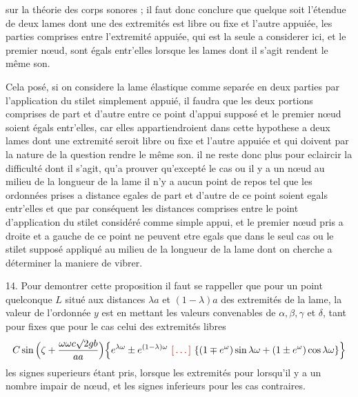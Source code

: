 \documentclass[11pt,a4paper]{article}
\begin{document}
sur la théorie des corps sonores ; il faut donc conclure que quelque soit
l'étendue de deux lames dont une des extremités est libre ou fixe et l'autre
appuiée, les parties comprises entre l'extremité appuiée, qui est la seule a
considerer ici, et le premier nœud, sont égals entr'elles lorsque les lames
dont il s'agit rendent le même son.

Cela posé, si on considere la lame élastique comme separée en deux parties
par l'application du stilet simplement appuié, il faudra que les deux
 portions comprises de part et d'autre entre ce point d'appui
supposé et le premier nœud soient égals entr'elles, car elles
appartiendroient dans cette hypothese a deux lames dont une extremité seroit
libre ou fixe et l'autre appuiée et qui doivent par la nature de la question
rendre le même son. il ne reste donc plus pour eclaircir la difficulté dont
il s'agit, qu'a prouver qu'excepté le cas ou il y a un nœud au milieu de la
longueur de la lame il n'y a aucun point de repos tel que les ordonnées
prises a distance egales de part et d'autre de ce point soient egals
entr'elles et que par conséquent les distances comprises entre le point
d'application du stilet considéré comme simple appui, et le premier nœud
pris a droite et a gauche de ce point ne peuvent etre egals que dans le seul
cas ou le stilet   supposé appliqué au milieu de la
longueur de la lame dont on cherche a déterminer la maniere de vibrer.

14. Pour demontrer cette proposition il faut se rappeller que pour un point
quelconque $L$ situé aux distances $\lambda a$ et $(1-\lambda)a$ des
extremités de la lame, la valeur de l'ordonnée $y$ est en mettant les valeurs
convenables de $\alpha, \beta, \gamma$ et $\delta$, tant pour  fixes que pour le cas celui des extremités libres
\[ C\sin\Big(\zeta+\frac{\omega\omega c\surd 2gb}{aa}\Big)\Big\{e^{\lambda\omega}\pm e^{(1-\lambda)\omega}\ \ill{}\ \{(1\mp e^{\omega})\sin\lambda\omega+(1\pm e^{\omega})\cos\lambda\omega\}\Big\} \]
les signes superieurs étant pris, lorsque les extremités 
pour  lorsqu'il y a un nombre impair de nœud,  et
les signes inferieurs pour les cas contraires.
\end{document}
